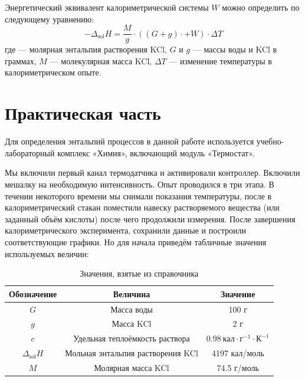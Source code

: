 \documentclass[a4paper]{article}
\begin{document}
Энергетический эквивалент калориметрической системы $W$ можно определить по следующему уравнению:
\begin{equation}
    -\Delta_\text{sol}H = \dfrac{M}{g} \cdot ((G + g) \cdot + W) \cdot \Delta T
\end{equation}
где  --- молярная энтальпия растворения KCl,
$G$ и $g$ --- массы воды и KCl в граммах,
$M$ --- молекулярная масса KCl,
$\Delta T$ --- изменение температуры в калориметрическом опыте.

\section*{\centering Практическая часть}

Для определения энтальпий процессов в данной работе используется
учебно-лабораторный комплекс «Химия», включающий модуль «Термостат».

Мы включили первый канал термодатчика и активировали контроллер.
Включили мешалку на необходимую интенсивность. Опыт проводился в три этапа.
В течении некоторого времени мы снимали показания температуры,
после в калориметрический стакан поместили навеску растворяемого вещества
(или заданный объём кислоты) после чего продолжили измерения.
После завершения калориметрического эксперимента,
сохранили данные и построили соответствующие графики.
Но для начала приведём табличные значения используемых величин:

\begin{table}[h]
    \begin{tabular}{|c|c|c|}
        \hline
        Обозначение          & Величина                          & Значение                                              \\
        \hline
        \hline
        $G$                  & Масса воды                        & 100 г                                                  \\
        \hline
        $g$                  & Масса KCl                         & 2 г                                                    \\
        \hline
        $c$                  & Удельная теплоёмкость раствора    & $0.98\ \text{кал}\cdot\text{г}^{-1}\cdot\text{К}^{-1}$ \\
        \hline
        $\Delta_\text{sol}H$ & Мольная энтальпия растворения KCl & 4197 кал/моль                                         \\
        \hline
        $M$                  & Молярная масса KCl                & 74.5 г/моль                                           \\
        \hline
    \end{tabular}
    \caption{Значения, взятые из справочника}
\end{table}
\end{document}
